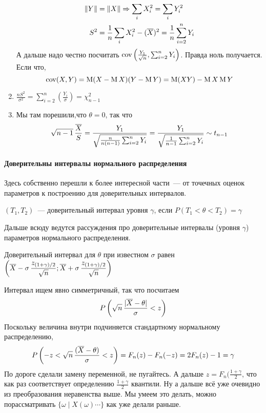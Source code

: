\documentclass[12pt,ebook]{../../../notes}
\begin{document}
\begin{ittproof}
\begin{enumerate}
\begin{align*}
        \|Y\| &= \|X\| \Rightarrow \sum_i X_i^2 = \sum_i Y_i^2 \\
        S^2 &= \frac{1}{n} \sum_i X_i^2 - (\overline{X})^2 = \frac{1}{n} \sum_{i=2}^n Y_i
      \end{align*}
      А дальше надо честно посчитать $\operatorname{cov} \left(\frac{Y_1}{\sqrt n}, \sum_{i=2}^n Y_i \right) $.
      Правда ноль получается.
      Если что, \[
        \operatorname{cov} (X,Y) = \operatorname{M} (X-\operatorname{M} X)(Y - \operatorname{M} Y) = \operatorname{M} (XY) - \operatorname{M} X \operatorname{M} Y
      \]
    \item $\displaystyle \frac{n S^2}{\sigma^2}  = \sum_{i=2}^n \left(\frac{Y_i}{\sigma} \right) =
      \chi^2_{n-1}$
    \item Мы там порешили,что $\theta=0$, так что  \[
        \displaystyle \sqrt{n-1} \,\frac{\overline{X} }{S} = \frac{Y_1}{ 
        \sqrt{\frac{n}{n(n-1)}\sum_{i=2}^n Y_i}}=\frac{Y_1}{\sqrt{\frac{1}{n-1}\sum_{i=2}^n Y_i}}
        \sim t_{n-1}
      \]
  \end{enumerate}
\end{ittproof}

\paragraph{Доверительны интервалы нормального распределения}
\label{par:stat::trintnorm}

Здесь собственно перешли к более интересной части~--- от точечных оценок параметров к построению
для доверительных интервалов.

\begin{defn}\label{defn:stat::trintnorm::trint}
  $(T_1, T_2)$~--- доверительный интервал уровня $\gamma$, если $P(T_1 < \theta < T_2) = \gamma$
\end{defn}

Дальше всюду ведутся рассуждения про доверительные интервалы (уровня $\gamma$)
параметров нормального распределения.

\begin{prop}\label{prop:stat::trintnorm::qdispkn}
  Доверительный интервал для $\theta$ при известном $\sigma$ равен 
  $\displaystyle \left( \overline{X} - \sigma \, \frac{z_{(1+\gamma)/2}}{\sqrt n} ; 
  \overline{X} + \sigma \, \frac{z_{(1+\gamma)/2}}{ \sqrt n} \right)$
\end{prop}
\begin{itlproof}
  Интервал ищем явно симметричный, так что посчитаем \[
    P\left(\sqrt n \, \frac{|\overline{X} - \theta|}{\sigma} < z \right) 
  \]
  Поскольку величина внутри подчиняется стандартному нормальному распределению, 
  \[
  P\left(-z < \sqrt n \, \frac{(\overline{X} - \theta)}{\sigma} < z \right) = F_n(z) - F_n(-z) = 
  2 F_n(z) - 1 = \gamma
  \]
  По дороге сделали замену переменной, не пугайтесь.
  А дальше $z = F_n(\frac{1+\gamma}{2} $, что как раз соответствует определению
  $\frac{1+\gamma}{2} $ квантили. Ну а дальше всё уже очевидно из преобразования неравенства
  выше. Мы умеем это делать, можно порассматривать $\{\omega \mid X(\omega) \cdots \}$ как уже
  делали раньше.
\end{itlproof}
\end{document}
